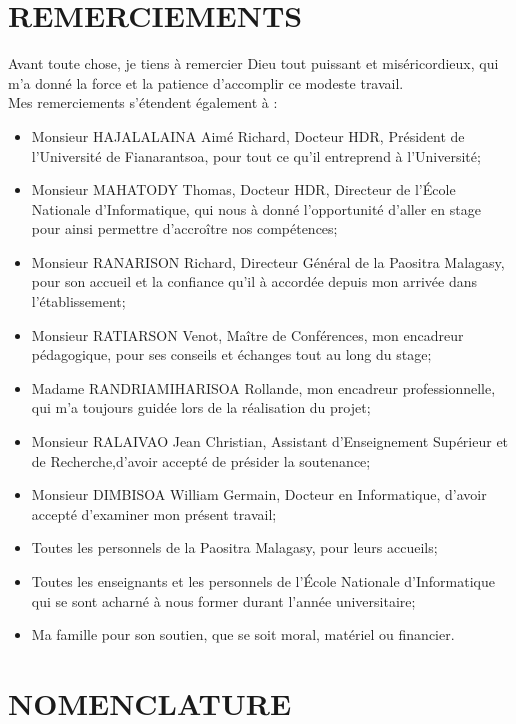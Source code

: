 \documentclass[12pt]{report}
\begin{document}
			\chapter*{REMERCIEMENTS}
			\begin{minipage}{\textwidth}
				\hspace{15pt} Avant toute chose, je tiens à remercier Dieu tout puissant et miséricordieux, qui m'a donné la force et la patience d'accomplir ce modeste travail.\\[0.5cm]
				Mes remerciements s’étendent également à :
				\begin{itemize}
					\item Monsieur HAJALALAINA Aimé Richard, Docteur HDR, Président de l'Université de Fianarantsoa, pour tout ce qu'il entreprend à l'Université;
					\item Monsieur MAHATODY Thomas, Docteur HDR, Directeur de l’École Nationale d'Informatique, qui nous à donné l'opportunité d'aller en stage pour ainsi permettre d’accroître nos compétences;
					\item Monsieur RANARISON Richard, Directeur Général de la Paositra Malagasy, pour son accueil et la confiance qu'il à accordée depuis mon arrivée dans l’établissement;
					\item Monsieur RATIARSON Venot, Maître de Conférences, mon encadreur pédagogique, pour ses conseils et échanges tout au long du stage;
					\item Madame RANDRIAMIHARISOA Rollande, mon encadreur professionnelle, qui m'a toujours guidée lors de la réalisation du projet;
					\item Monsieur RALAIVAO Jean Christian, Assistant d'Enseignement Supérieur et de Recherche,d’avoir accepté de présider la soutenance;
				 	\item Monsieur DIMBISOA William Germain, Docteur en Informatique, d'avoir accepté d'examiner mon présent travail;
					\item Toutes les personnels de la Paositra Malagasy, pour leurs accueils;
					\item Toutes les enseignants et les personnels de l’École Nationale d'Informatique qui se sont acharné à nous former durant l'année universitaire;
					\item Ma famille pour son soutien, que se soit moral, matériel ou financier.
				\end{itemize}
			\end{minipage}
			\newpage
			\tableofcontents
			\newpage
			\chapter*{NOMENCLATURE}
			\newpage
			\listoftables
			\newpage
			\listoffigures
			\newpage
			\newpage
			\setcounter{page}{1}
\end{document}
